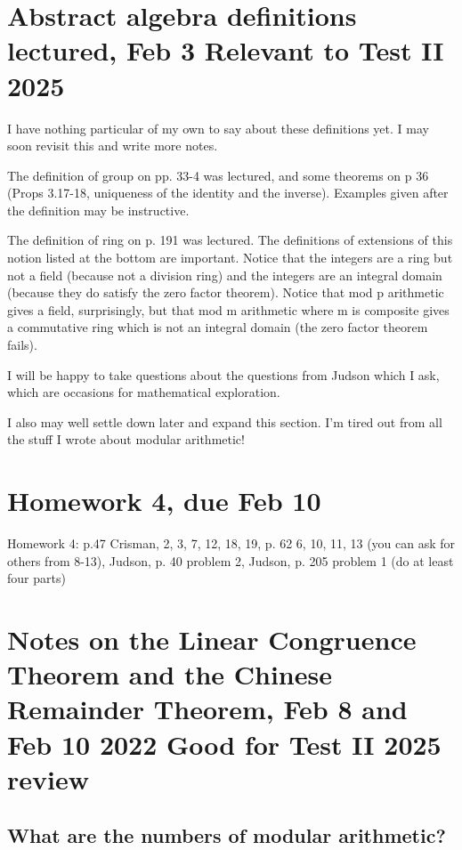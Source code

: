 \documentclass[12pt]{article}
\begin{document}
\newpage


\section{Abstract algebra definitions lectured, Feb 3   Relevant to Test II 2025}

I have nothing particular of my own to say about these definitions yet.  I may soon revisit this and write more notes.

The definition of group on pp. 33-4 was lectured, and some theorems on p 36 (Props 3.17-18, uniqueness of the identity and the inverse).  Examples given after the definition may be instructive.

The definition of ring on p. 191 was lectured.  The definitions of extensions of this notion listed at the bottom are important.  Notice that
the integers are a ring but not a field (because not a division ring) and the integers are an integral domain (because they do satisfy the zero factor theorem).
Notice that mod p arithmetic gives a field, surprisingly, but that mod m arithmetic where m is composite gives a commutative ring which is not an integral domain (the zero factor theorem fails).

I will be happy to take questions about the questions from Judson which I ask, which are occasions for mathematical exploration.

I also may well settle down later and expand this section.  I'm tired out from all the stuff I wrote about modular arithmetic!

\section{Homework 4, due Feb 10}

Homework 4:  p.47 Crisman, 2, 3, 7, 12, 18, 19, p. 62 6, 10, 11, 13 (you can ask for others from 8-13), Judson, p. 40 problem 2, Judson, p. 205 problem 1 (do at least four parts)

\section{Notes on the Linear Congruence Theorem and the Chinese Remainder Theorem, Feb 8 and Feb 10 2022  Good for Test II 2025 review}

\subsection{What are the numbers of modular arithmetic?}
\end{document}
